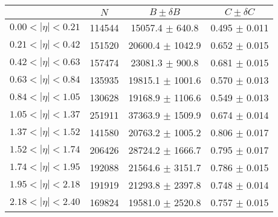 \begin{tabular}{lccc}
\hline
    &   $N$   & $B \pm \delta B$  &  $C \pm \delta C$ \\
\hline
$0.00 < |\eta| <0.21$          & 114544     & 15057.4    $\pm$ 640.8 & 0.495      $\pm$ 0.011 \\
$0.21 < |\eta| <0.42$          & 151520     & 20600.4    $\pm$ 1042.9 & 0.652      $\pm$ 0.015 \\
$0.42 < |\eta| <0.63$          & 157474     & 23081.3    $\pm$ 900.8 & 0.681      $\pm$ 0.015 \\
$0.63 < |\eta| <0.84$          & 135935     & 19815.1    $\pm$ 1001.6 & 0.570      $\pm$ 0.013 \\
$0.84 < |\eta| <1.05$          & 130628     & 19168.9    $\pm$ 1106.6 & 0.549      $\pm$ 0.013 \\
$1.05 < |\eta| <1.37$          & 251911     & 37363.9    $\pm$ 1509.9 & 0.674      $\pm$ 0.014 \\
$1.37 < |\eta| <1.52$          & 141580     & 20763.2    $\pm$ 1005.2 & 0.806      $\pm$ 0.017 \\
$1.52 < |\eta| <1.74$          & 206426     & 28724.2    $\pm$ 1666.7 & 0.795      $\pm$ 0.017 \\
$1.74 < |\eta| <1.95$          & 192088     & 21564.6    $\pm$ 3151.7 & 0.786      $\pm$ 0.015 \\
$1.95 < |\eta| <2.18$          & 191919     & 21293.8    $\pm$ 2397.8 & 0.748      $\pm$ 0.014 \\
$2.18 < |\eta| <2.40$          & 169824     & 19581.0    $\pm$ 2520.8 & 0.757      $\pm$ 0.015 \\
\hline
\end{tabular}
